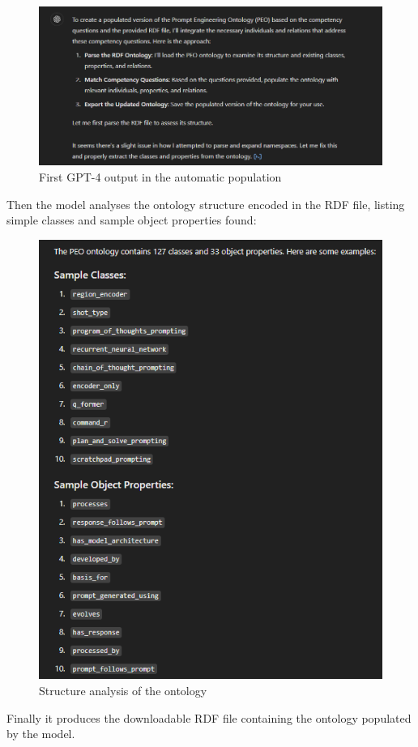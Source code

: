 \begin{figure}[H]
    \centering
    \includegraphics[width=0.9\linewidth]{Figures/fig_35.png}
    \caption{First GPT-4 output in the automatic population}
    \label{fig:enter-label}
\end{figure}
Then the model analyses the ontology structure encoded in the RDF file, listing simple classes and sample object properties found:
\begin{figure}[H]
    \centering
    \includegraphics[width=0.85\linewidth]{Figures/fig_36.png}
    \caption{Structure analysis of the ontology}
    \label{fig:enter-label}
\end{figure}
Finally it produces the downloadable RDF file containing the ontology populated by the model.
